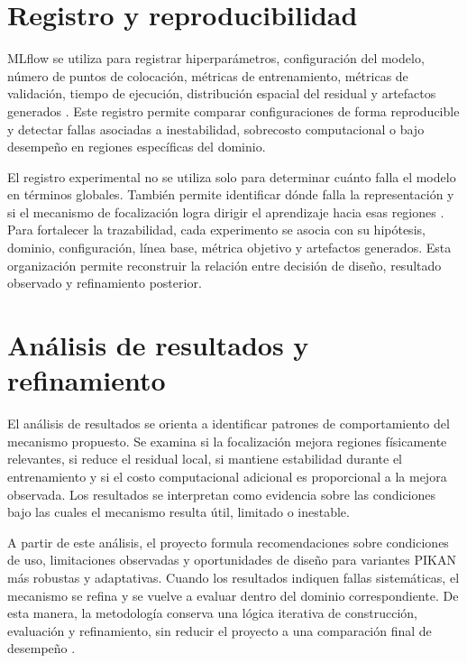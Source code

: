 \section{Registro y reproducibilidad}
\label{subsec:reproducibilidad}

MLflow se utiliza para registrar hiperparámetros, configuración del modelo, número de puntos de colocación, métricas de entrenamiento, métricas de validación, tiempo de ejecución, distribución espacial del residual y artefactos generados \cite{zaharia2018mlflow}. Este registro permite comparar configuraciones de forma reproducible y detectar fallas asociadas a inestabilidad, sobrecosto computacional o bajo desempeño en regiones específicas del dominio.

El registro experimental no se utiliza solo para determinar cuánto falla el modelo en términos globales. También permite identificar dónde falla la representación y si el mecanismo de focalización logra dirigir el aprendizaje hacia esas regiones \cite{lu2021deepxde,shukla2024fair,zaharia2018mlflow}. Para fortalecer la trazabilidad, cada experimento se asocia con su hipótesis, dominio, configuración, línea base, métrica objetivo y artefactos generados. Esta organización permite reconstruir la relación entre decisión de diseño, resultado observado y refinamiento posterior.

\section{Análisis de resultados y refinamiento}
\label{subsec:analisis-refinamiento}

El análisis de resultados se orienta a identificar patrones de comportamiento del mecanismo propuesto. Se examina si la focalización mejora regiones físicamente relevantes, si reduce el residual local, si mantiene estabilidad durante el entrenamiento y si el costo computacional adicional es proporcional a la mejora observada. Los resultados se interpretan como evidencia sobre las condiciones bajo las cuales el mecanismo resulta útil, limitado o inestable.

A partir de este análisis, el proyecto formula recomendaciones sobre condiciones de uso, limitaciones observadas y oportunidades de diseño para variantes PIKAN más robustas y adaptativas. Cuando los resultados indiquen fallas sistemáticas, el mecanismo se refina y se vuelve a evaluar dentro del dominio correspondiente. De esta manera, la metodología conserva una lógica iterativa de construcción, evaluación y refinamiento, sin reducir el proyecto a una comparación final de desempeño \cite{peffers2007dsrm}.

